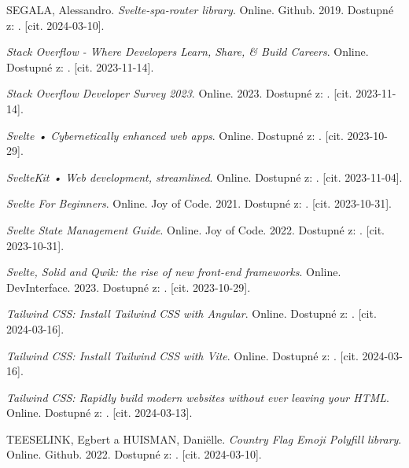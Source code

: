 \begin{thebibliography}{99}
\textsc{SEGALA}, Alessandro. \emph{Svelte-spa-router library}. Online. Github. 2019. Dostupné z: . [cit. 2024-03-10].

\emph{Stack Overflow - Where Developers Learn, Share, \& Build Careers}. Online. Dostupné z: . [cit. 2023-11-14].

\emph{Stack Overflow Developer Survey 2023}. Online. 2023. Dostupné z: . [cit. 2023-11-14].

\emph{Svelte • Cybernetically enhanced web apps}. Online. Dostupné z: . [cit. 2023-10-29].

\emph{SvelteKit • Web development, streamlined}. Online. Dostupné z: . [cit. 2023-11-04].

\emph{Svelte For Beginners}. Online. Joy of Code. 2021. Dostupné z: . [cit. 2023-10-31].

\emph{Svelte State Management Guide}. Online. Joy of Code. 2022. Dostupné z: . [cit. 2023-10-31].

\emph{Svelte, Solid and Qwik: the rise of new front-end frameworks}. Online. DevInterface. 2023. Dostupné z: . [cit. 2023-10-29].

\emph{Tailwind CSS: Install Tailwind CSS with Angular}. Online. Dostupné z: . [cit. 2024-03-16].

\emph{Tailwind CSS: Install Tailwind CSS with Vite}. Online. Dostupné z: . [cit. 2024-03-16].

\emph{Tailwind CSS: Rapidly build modern websites without ever leaving your HTML}. Online. Dostupné z: . [cit. 2024-03-13].

\textsc{TEESELINK}, Egbert a \textsc{HUISMAN}, Daniëlle. \emph{Country Flag Emoji Polyfill library}. Online. Github. 2022. Dostupné z: . [cit. 2024-03-10].


\end{thebibliography}
